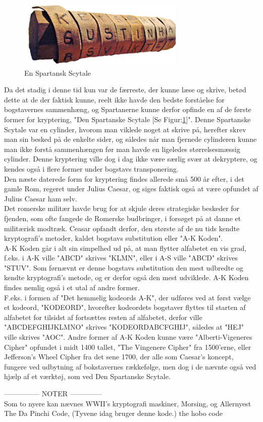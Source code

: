 \begin{figure}[H]
    \centering
    \includegraphics[scale=1.2]{Projectdoc/Problemanalyse/Illustrationer/scytale.jpg}
    \caption{En Spartansk Scytale}
    \label{fig:scytale}
\end{figure}
\noindent
Da det stadig i denne tid kun var de færreste, der kunne læse og skrive, betød dette at de der faktisk kunne, reelt ikke havde den bedste forståelse for bogstavernes sammenhæng, og Spartanerne kunne derfor opfinde en af de første former for kryptering, "Den Spartanske Scytale [Se Figur:\ref{fig:scytale}]". Denne Spartanske Scytale var en cylinder, hvorom man viklede noget at skrive på, herefter skrev man sin besked på de enkelte sider, og således når man fjernede cylinderen kunne man ikke forstå sammenhængen før man havde en ligeledes størrelsesmæssig cylinder. Denne kryptering ville dog i dag ikke være særlig svær at dekryptere, og kendes også i flere former under bogstavs transponering.\\
Den næste daterede form for kryptering findes allerede små 500 år efter, i det gamle Rom, regeret under Julius Caesar, og siges faktisk også at være opfundet af Julius Caesar ham selv.\cite{PastCryptography}\\ 
Det romerske militær havde brug for at skjule deres strategiske beskeder for fjenden, som ofte fangede de Romerske budbringer, i forsøget på at danne et militærisk modtræk. Ceasar opfandt derfor, den største af de nu tids kendte kryptografi's metoder, kaldet bogstavs substitution eller "A-K Koden".\\
A-K Koden går i alt sin simpelhed ud på, at man flytter alfabetet en vis grad, f.eks. i A-K ville "ABCD" skrives "KLMN", eller i A-S ville "ABCD" skrives "STUV".\cite{TheSecretLanguage}
Som førnævnt er denne bogstavs substitution den mest udbredte og kendte kryptografi's metode, og er derfor også den mest udviklede. A-K Koden findes nemlig også i et utal af andre former.\\ 
F.eks. i formen af "Det hemmelig kodeords A-K", der udføres ved at først vælge et kodeord, "KODEORD", hvorefter kodeordets bogstaver flyttes til starten af alfabetet for tilsidst af fortsættes resten af alfabetet, derfor ville "ABCDEFGHIJKLMNO" skrives "KODEORDABCFGHIJ", således at "HEJ" ville skrives "AOC". \cite{TheSecretLanguage}
Andre former af A-K Koden kunne være "Alberti-Vigeneres Cipher" opfundet i midt 1400 tallet, "The Vingenere Cipher" fra 1500'erne, eller Jefferson's Wheel Cipher fra det sene 1700,\cite{PastCryptography} der alle som Caesar's koncept, fungere ved udbytning af bokstavernes rækkefølge, men dog i de nævnte også ved hjælp af et værktøj, som ved Den Spartanske Scytale.



--------------- NOTER --------------\\
Som to nyere kan nævnes WWII's kryptografi maskiner, Morsing, og
Allernyest The Da Pinchi Code, (Tyvene idag bruger denne kode.) the hobo code